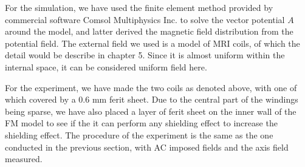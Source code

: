 For the simulation,
we have used the finite element method provided by commercial software Comsol Multiphysics Inc. to solve the vector potential $A$ around the model,
and latter derived the magnetic field distribution from the potential field.
The external field we used is a model of MRI coils, of which the detail would be describe in chapter 5.
Since it is almost uniform within the internal space, it can be considered uniform field here.

For the experiment,
we have made the two coils as denoted above, with one of which covered by a $0.6$ mm ferit sheet.
Due to the central part of the windings being sparse,
we have also placed a layer of ferit sheet on the inner wall of the FM model to see if the it can perform any shielding effect to increase the shielding effect.
The procedure of the experiment is the same as the one conducted in the previous section,
with AC imposed fields and the axis field measured.


